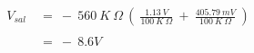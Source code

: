 {\bfseries\itshape{}} 

\begin{flushright}
{\bfseries\itshape{}} \hfill \break
\end{flushright}

\begin{ceqn}
\begin{align*}
V_{sal}\ &=\ -\ 560\ K\ \Omega\ (\ \frac{1.13\ V}{100\ K\ \Omega}\ +\ \frac{405.79\ mV}{100\ K\ \Omega}\ ) \\ \\
&=\ -\ 8.6 V
\end{align*}
\end{ceqn} \hfill \break

\pagebreak